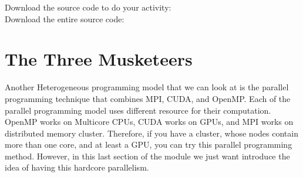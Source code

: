\documentclass[letterpaper,10pt,openany,oneside]{sphinxmanual}
\begin{document}
\begin{description}
\item[{Download the source code to do your activity:}] \leavevmode
{}


\item[{Download the entire source code:}] \leavevmode
{}


\end{description}


\chapter{The Three Musketeers}
\label{TheThreeMusketeers/TheThreeMusketeers::doc}\label{TheThreeMusketeers/TheThreeMusketeers:the-three-musketeers}
Another Heterogeneous programming model that we can look at is the parallel programming technique that combines MPI, CUDA, and OpenMP. Each of the parallel programming model uses different resource for their computation. OpenMP works on Multicore CPUs, CUDA works on GPUs, and MPI works on distributed memory cluster. Therefore, if you have a cluster, whose nodes contain more than one core, and at least a GPU, you can try this parallel programming method. However, in this last section of the module we just want introduce the idea of having this hardcore parallelism.



\renewcommand{\indexname}{Index}
\printindex
\end{document}
